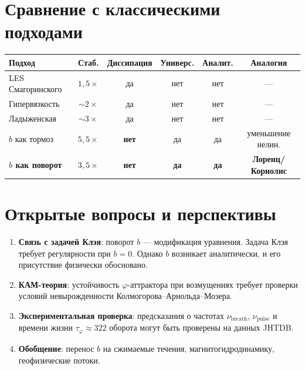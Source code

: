 \documentclass[11pt,a4paper,twoside]{article}
\theoremstyle{remark}
\begin{document}
\section{Сравнение с классическими подходами}
\label{sec:comparison}

\begin{center}
\begin{tabular}{lccccc}
\toprule
Подход & Стаб. & Диссипация & Универс. & Аналит. & Аналогия \\
\midrule
LES Смагоринского & $1{,}5\times$ & да & нет & нет & --- \\
Гипервязкость & $\sim 2\times$ & да & нет & нет & --- \\
Ладыженская & $\sim 3\times$ & да & нет & нет & --- \\
$b$ как тормоз & $5{,}5\times$ & \textbf{нет} & да & да & уменьшение нелин. \\
\textbf{$b$ как поворот} & $3{,}5\times$ & \textbf{нет} & \textbf{да} & \textbf{да} & \textbf{Лоренц/Кориолис} \\
\bottomrule
\end{tabular}
\end{center}

\section{Открытые вопросы и перспективы}
\label{sec:open}

\begin{enumerate}
    \item \textbf{Связь с задачей Клэя}: поворот $b$ --- модификация уравнения. Задача Клэя требует регулярности при $b = 0$. Однако $b$ возникает аналитически, и его присутствие физически обосновано.

    \item \textbf{КАМ-теория}: устойчивость $\varphi$-аттрактора при возмущениях требует проверки условий невырожденности Колмогорова--Арнольда--Мозера.

    \item \textbf{Экспериментальная проверка}: предсказания о частотах $\nu_{\mathrm{breath}}$, $\nu_{\mathrm{pulse}}$ и времени жизни $\tau_\varphi \approx 322$ оборота могут быть проверены на данных JHTDB.

    \item \textbf{Обобщение}: перенос $b$ на сжимаемые течения, магнитогидродинамику, геофизические потоки.
\end{enumerate}
\end{document}
